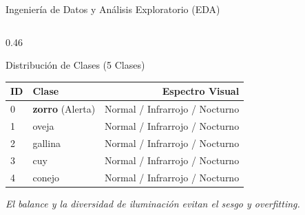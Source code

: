 \documentclass[10pt,aspectratio=169]{beamer}
\begin{document}
\begin{frame}{Ingeniería de Datos y Análisis Exploratorio (EDA)}
\begin{columns}[T]
    \begin{column}{0.46\textwidth}
      \begin{block}{Distribución de Clases (5 Clases)}
        \centering
        \small
        \begin{tabular}{llr}
          \toprule
          \textbf{ID} & \textbf{Clase} & \textbf{Espectro Visual} \\
          \midrule
          0 & \textbf{zorro} (Alerta) & Normal / Infrarrojo / Nocturno \\
          1 & oveja & Normal / Infrarrojo / Nocturno \\
          2 & gallina & Normal / Infrarrojo / Nocturno \\
          3 & cuy & Normal / Infrarrojo / Nocturno \\
          4 & conejo & Normal / Infrarrojo / Nocturno \\
          \bottomrule
        \end{tabular}
      \end{block}
      \vspace{0.1cm}
      \centering \scriptsize
      \textit{El balance y la diversidad de iluminación evitan el sesgo y overfitting.}
    \end{column}
  \end{columns}
\end{frame}
\end{document}
